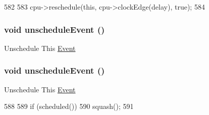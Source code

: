 \begin{DoxyCode}
582 {
583     cpu->reschedule(this, cpu->clockEdge(delay), true);
584 }
\end{DoxyCode}
\hypertarget{classMipsISA_1_1ISA_1_1CP0Event_a8521a64adc8d310754330bc7dfe48831}{
\subsubsection[{unscheduleEvent}]{\setlength{\rightskip}{0pt plus 5cm}void unscheduleEvent ()}}
\label{classMipsISA_1_1ISA_1_1CP0Event_a8521a64adc8d310754330bc7dfe48831}
Unschedule This \hyperlink{classEvent}{Event} \hypertarget{classMipsISA_1_1ISA_1_1CP0Event_a8521a64adc8d310754330bc7dfe48831}{
\subsubsection[{unscheduleEvent}]{\setlength{\rightskip}{0pt plus 5cm}void unscheduleEvent ()}}
\label{classMipsISA_1_1ISA_1_1CP0Event_a8521a64adc8d310754330bc7dfe48831}
Unschedule This \hyperlink{classEvent}{Event} 


\begin{DoxyCode}
588 {
589     if (scheduled())
590         squash();
591 }
\end{DoxyCode}


